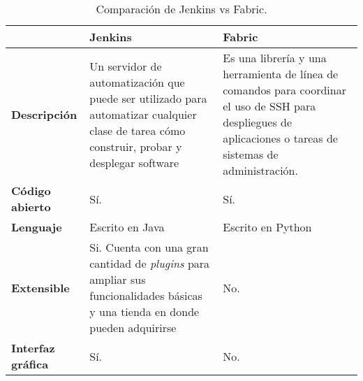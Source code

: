 \begin{table}[h]
\centering
\caption{Comparación de Jenkins vs Fabric.}
\label{tabla:6.1}
\begin{tabular}{| p{} | p{} | p{} |}
\hline
                                                 & \textbf{Jenkins}                                                                                                                                   & \textbf{Fabric}                                                                                                                                              \\ \hline
\textbf{Descripción}                             & Un servidor de automatización que puede ser utilizado para automatizar cualquier clase de tarea cómo construir, probar y desplegar software        & Es una librería y una herramienta de línea de comandos para coordinar el uso de SSH para despliegues de aplicaciones o tareas de sistemas de administración. \\ \hline
\textbf{Código abierto}                          & Sí.                                                                                                                                                & Sí.                                                                                                                                                          \\ \hline
\textbf{Lenguaje}                                & Escrito en Java                                                                                                                                    & Escrito en Python                                                                                                                                            \\ \hline
\textbf{Extensible}                              & Si. Cuenta con una gran cantidad de \textit{plugins} para ampliar sus funcionalidades básicas y una tienda en donde pueden adquirirse                       & No.                                                                                                                                                          \\ \hline
\textbf{Interfaz gráfica}                        & Sí.                                                                                                                                                & No.                                                                                                                                                          \\ \hline

\end{tabular}
\end{table}
